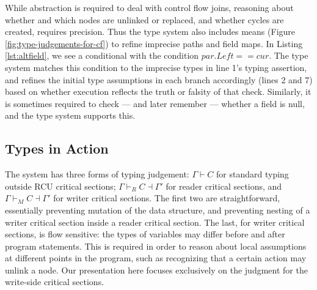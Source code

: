 While abstraction is required to deal with control flow joins, reasoning about whether and which nodes are unlinked or replaced, and whether cycles are created, requires precision.  Thus the type system also includes means (Figure \ref{fig:type-judgements-for-cf}) to refine imprecise paths and field maps.
%
In Listing \ref{lst:altfield}, we see a conditional with the condition $par.Left == cur$. The type system matches this condition to the imprecise types in line 1's typing assertion, and refines the initial type assumptions in each branch accordingly (lines 2 and 7) based on whether execution reflects the truth or falsity of that check.
Similarly, it is sometimes required to check --- and later remember --- whether  a field is null, and the type system supports this.
\subsection{Types in Action}
\label{subsection:type-action}

The system has three forms of typing judgement: 
$\Gamma \vdash C$ for standard typing outside RCU critical sections; 
$\Gamma \vdash_R C \dashv \Gamma'$ for reader critical sections, and
$\Gamma \vdash_M C \dashv \Gamma'$ for writer critical sections.
The first two are straightforward, essentially preventing mutation of the data structure, and preventing nesting of a writer critical section inside a reader critical section.
The last, for writer critical sections, is flow sensitive: the types of variables may differ before and after program statements.  This is required in order to reason about local assumptions at different points in the program, such as recognizing that a certain action may unlink a node.
Our presentation here focuses exclusively on the judgment for the write-side critical sections.

